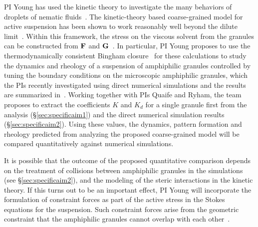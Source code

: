 PI Young has used the kinetic theory to investigate the many behaviors
of droplets of nematic fluids~\cite{YoungShelleyStein2021_MBE}. The
kinetic-theory based coarse-grained model for active suspension has been
shown to work reasonably well beyond the dilute
limit~\cite{Saintillan2018_ARFM}. Within this framework, the stress on
the viscous solvent from the granules can be constructed from ${\bf F}$
and ${\bf G}$~\cite{TraversoMichellin2020_PRF,
TraversoMichellin2022_JFM}. In particular, PI Young proposes to use the
thermodynamically consistent Bingham
closure~\cite{YoungShelleyStein2021_MBE} for these calculations to study
the dynamics and rheology of a suspension of amphiphilic granules
controlled by tuning the boundary conditions on the microscopic
amphiphilic granules, which the PIs recently investigated using direct
numerical simulations and the results are summarized
in~\cite{fu-ryh-qua-you2022}. Working together with PIs Quaife and
Ryham, the team proposes to extract the coefficients $K$ and $K_d$ for a
single granule first from the analysis (\S\ref{sec:specificaim1}) and
the direct numerical simulation results (\S\ref{sec:specificaim2}).
Using these values, the dynamics, pattern formation and rheology
predicted from analyzing the proposed coarse-grained model will be
compared quantitatively against numerical simulations. 

It is possible that the outcome of the proposed quantitative comparison
depends on the treatment of collisions between amphiphilic granules in
the simulations (see \S\ref{sec:specificaim2}), and the modeling of the
steric interactions in the kinetic theory. If this turns out to be an
important effect, PI Young will incorporate the formulation of
constraint forces as part of the active stress in the Stokes equations
for the suspension. Such constraint forces arise from the geometric
constraint that the amphiphilic granules cannot overlap with each
other~\cite{Weady2022_PRF}. 

